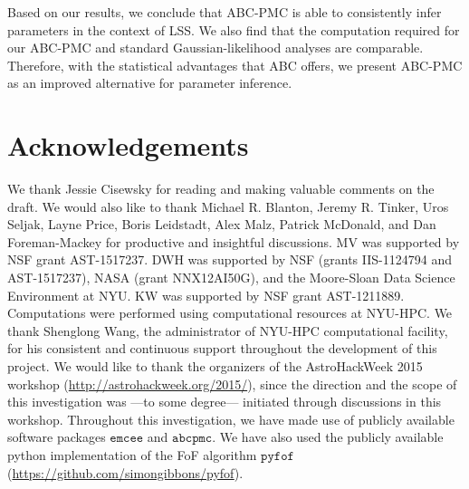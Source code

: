 Based on our results, we conclude that ABC-PMC is able to consistently infer parameters in the context
of LSS. We also find that the computation required for our ABC-PMC and standard Gaussian-likelihood 
analyses are comparable. Therefore, with the statistical advantages that ABC offers, we present ABC-PMC 
as an improved alternative for parameter inference. 


\section*{Acknowledgements}

We thank Jessie Cisewsky for reading and making valuable comments on the draft. We would also like to thank Michael R. Blanton, Jeremy R. Tinker, Uros Seljak, Layne Price, 
Boris Leidstadt, Alex Malz, Patrick McDonald, and Dan Foreman-Mackey for productive 
and insightful discussions. MV was supported by NSF grant AST-1517237. DWH was supported 
by NSF (grants IIS-1124794 and AST-1517237), NASA (grant NNX12AI50G), and the Moore-Sloan 
Data Science Environment at NYU. KW was supported by NSF grant AST-1211889. Computations 
were performed using computational resources at NYU-HPC. We thank Shenglong Wang, the 
administrator of NYU-HPC computational facility, for his consistent and continuous support 
throughout the development of this project. We would like to thank the organizers of 
the AstroHackWeek 2015 workshop (\url{http://astrohackweek.org/2015/}), 
since the direction and the scope of this investigation was ---to some degree--- initiated 
through discussions in this workshop. Throughout this investigation, we have made use of 
publicly available software packages $\mathtt{emcee}$ and $\mathtt{abcpmc}$. We have also used the publicly available python implementation of the FoF algorithm $\mathtt{pyfof}$ (\url{https://github.com/simongibbons/pyfof}).



